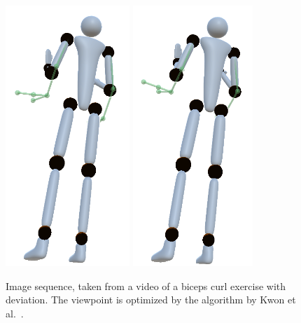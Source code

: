 \begin{figure}[th!]
	\includegraphics[width=0.12\linewidth]{pictures/kwonSequence7.png}\hfill
	\includegraphics[width=0.115\linewidth]{pictures/kwonSequence8.png}\hfill
	\caption{Image sequence, taken from a video of a biceps curl exercise with deviation. The viewpoint is optimized by the algorithm by Kwon et al.~\cite{kwon2020ocp}.}
	\label{fig:kwonSequence}
\end{figure}

